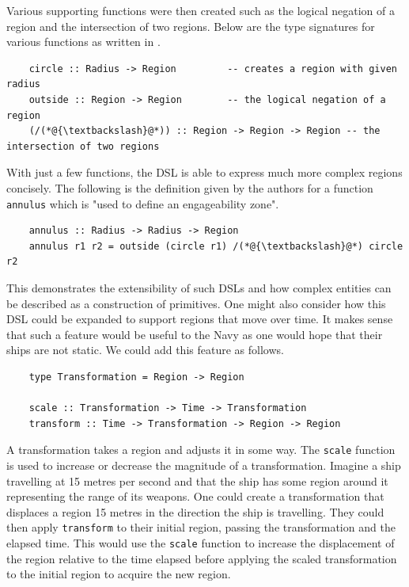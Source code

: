 \documentclass[11pt]{article}
\begin{document}
Various supporting functions were then created such as the logical negation of a
region and the intersection of two regions. Below are the type signatures for
various functions as written in \cite{regions}.

\begin{lstlisting}
    circle :: Radius -> Region         -- creates a region with given radius
    outside :: Region -> Region        -- the logical negation of a region
    (/(*@{\textbackslash}@*)) :: Region -> Region -> Region -- the intersection of two regions
\end{lstlisting}

With just a few functions, the DSL is able to express much more complex regions
concisely. The following is the definition given by the authors for a function
\texttt{annulus} which is "used to define an engageability zone".

\begin{lstlisting}
    annulus :: Radius -> Radius -> Region
    annulus r1 r2 = outside (circle r1) /(*@{\textbackslash}@*) circle r2
\end{lstlisting}

This demonstrates the extensibility of such DSLs and how complex entities
can be described as a construction of primitives. One might also consider
how this DSL could be expanded to support regions that move over time.
It makes sense that such a feature would be useful to the Navy as one
would hope that their ships are not static. We could add this feature
as follows.

\begin{lstlisting}
    type Transformation = Region -> Region

    scale :: Transformation -> Time -> Transformation
    transform :: Time -> Transformation -> Region -> Region
\end{lstlisting}

A transformation takes a region and adjusts it in some way. The \texttt{scale}
function is used to increase or decrease the magnitude of a transformation.
Imagine a ship travelling at 15 metres per second and that the ship has some
region around it representing the range of its weapons. One could create a transformation
that displaces a region 15 metres in the direction the ship is travelling. They could then apply
\texttt{transform} to their initial region, passing the transformation
and the elapsed time. This would use the \texttt{scale} function to increase the
displacement of the region relative to the time elapsed before applying the
scaled transformation to the initial region to acquire the new region.
\end{document}
